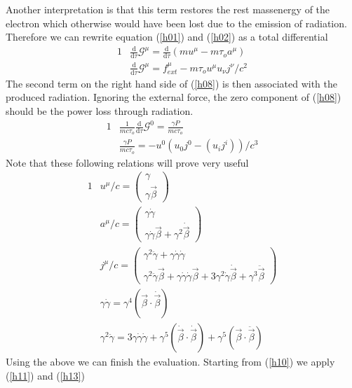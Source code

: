 \documentclass[]{article}
\numberwithin{equation}{subsection}
\begin{document}
\noindent Another interpretation is that this term restores the rest massenergy of the electron which otherwise would have been lost due to the emission of radiation. Therefore we can rewrite equation (\ref{h01}) and (\ref{h02}) as a total differential
	\begin{alignat}{1}
	\label{h07}		&\frac{\mathrm{d}}{\mathrm{d}\tau}\mathcal{G}^{\mu}=\frac{\mathrm{d}}{\mathrm{d}\tau}(mu^{\mu}-m\tau_{o}a^{\mu})\\
	\label{h08}		&\frac{\mathrm{d}}{\mathrm{d}\tau}\mathcal{G}^{\mu}=f^{\mu}_{ext}-m\tau_{o}u^{\mu}u_{\nu}j^{\nu}/c^{2}
	\end{alignat}
The second term on the right hand side of (\ref{h08}) is then associated with the produced radiation. Ignoring the external force, the zero component of (\ref{h08}) should be the power loss through radiation.
	\begin{alignat}{1}
	\label{h09}		&\frac{1}{mc\tau_{o}}\frac{\mathrm{d}}{\mathrm{d}\tau}\mathcal{G}^{0}=\frac{\gamma P}{mc\tau_{o}}\\
	\label{h10}		&\frac{\gamma P}{mc\tau_{o}}=-u^{0}(u_{0}j^{0}-(u_{i}j^{i}))/c^{3}
	\end{alignat}
Note that these following relations will prove very useful
	\begin{alignat}{1}
	\label{h11}		&u^{\mu}/c=
		\begin{pmatrix}
			\gamma\\
			\gamma\vec{\beta}
		\end{pmatrix}\\
	\label{h12}		&a^{\mu}/c=
		\begin{pmatrix}
			\gamma\dot{\gamma}\\
			\gamma\dot{\gamma}\vec{\beta}+\gamma^{2}\dot{\vec{\beta}}
		\end{pmatrix}\\
	\label{h13}		&j^{\mu}/c=
		\begin{pmatrix}
			\gamma^{2}\ddot{\gamma}+\gamma\dot{\gamma}\dot{\gamma}\\
			\gamma^{2}\ddot{\gamma}\vec{\beta}+\gamma\dot{\gamma}\dot{\gamma}\vec{\beta}+3\gamma^{2}\dot{\gamma}\dot{\vec{\beta}}+\gamma^{3}\ddot{\vec{\beta}}
		\end{pmatrix}\\
	\label{h14}		&\gamma\dot{\gamma}=\gamma^{4}(\vec{\beta}\cdot\dot{\vec{\beta}})\\
	\label{h15}		&\gamma^{2}\ddot{\gamma}=3\gamma\dot{\gamma}\dot{\gamma}+\gamma^{5}(\dot{\vec{\beta}}\cdot\dot{\vec{\beta}})+\gamma^{5}(\vec{\beta}\cdot\ddot{\vec{\beta}})
	\end{alignat}
Using the above we can finish the evaluation. Starting from (\ref{h10}) we apply (\ref{h11}) and (\ref{h13})
\end{document}
